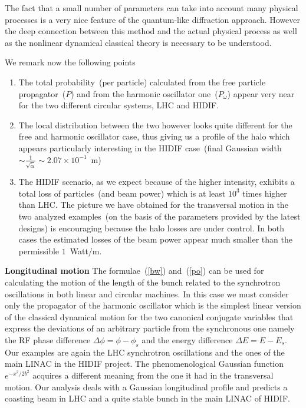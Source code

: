 \documentclass[]{article}
\begin{document}
The fact that a small number of parameters can take into account many 
physical processes is a very nice feature of the quantum-like diffraction
approach. However the deep connection between this method and the
actual physical process as well as the nonlinear dynamical classical 
theory is necessary to be understood. 

We remark now the following points 

\begin{enumerate}

\item
The total probability~(per particle) calculated from the free particle
propagator~($P$) and from the harmonic oscillator one~($P_{\omega}$)
appear very near for the two different circular systems, LHC and HIDIF.

\item
The local distribution between the two however looks quite different for 
the free
and harmonic oscillator case, thus giving us a profile of the halo 
which appears particularly interesting in the HIDIF case~(final Gaussian 
width $\sim \frac{1}{\sqrt{\tilde{\alpha}}} \sim 2.07 \times 10^{-1}$~m)

\item
The HIDIF scenario, as we expect because of the higher intensity, exhibits 
a total loss of particles~(and beam power) which is at least $10^3$
times higher than LHC. The picture we have obtained for the transversal
motion in the two analyzed examples~(on the basis of the parameters 
provided by the latest designs) is encouraging because the halo losses are
under control. In both cases the estimated losses of the beam power
appear much smaller than the permissible $1$~Watt/m. 


\end{enumerate}

\noindent
{\bf Longitudinal motion}
The formulae~(\ref{bw}) and~(\ref{po}) can be used for calculating the motion 
of the length of the bunch related to the synchrotron oscillations in both 
linear and circular machines. In this case we must consider only the 
propagator of the harmonic oscillator which is the simplest linear version 
of the classical dynamical motion for the two canonical conjugate variables 
that express the deviations of an arbitrary particle from the synchronous 
one namely the RF phase difference 
$\Delta \phi = \phi - \phi_s$ and the energy difference 
$\Delta E = E - E_s$.
Our examples are again the LHC synchrotron oscillations and the ones of 
the main LINAC in the HIDIF project. The phenomenological Gaussian function
$e^{- {x^2}/{2 b^2}}$ acquires a different meaning from the one it had in 
the transversal motion. Our analysis deals with a Gaussian longitudinal 
profile and predicts a coasting beam in LHC and a quite stable bunch in the
main LINAC of HIDIF.
\end{document}
